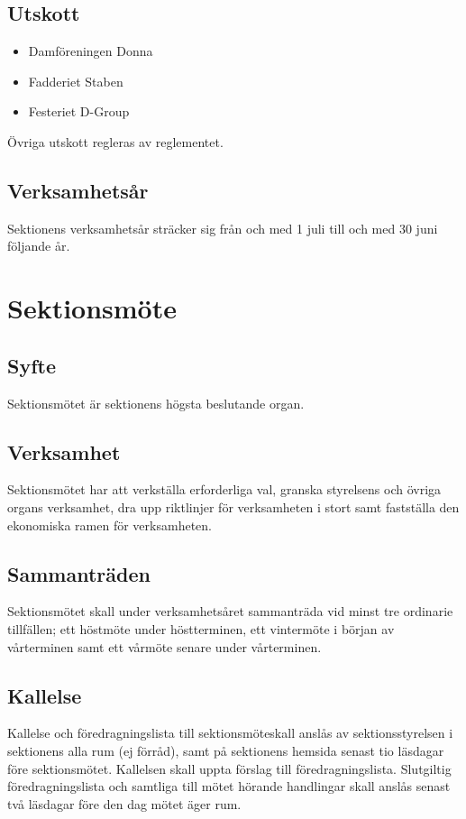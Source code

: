 \documentclass{datateknologsektionen-document}
\begin{document}
\subsection{Utskott}
\label{utskott}
\begin{itemize}
  \item Damföreningen Donna
  \item Fadderiet Staben
  \item Festeriet D-Group
\end{itemize}
Övriga utskott regleras av reglementet.

\subsection{Verksamhetsår}
Sektionens verksamhetsår sträcker sig från och med 1 juli till och med 30 juni följande
år.

\section{Sektionsmöte}
\subsection{Syfte}
Sektionsmötet är sektionens högsta beslutande organ.

\subsection{Verksamhet}
Sektionsmötet har att verkställa erforderliga val, granska styrelsens och övriga organs
verksamhet, dra upp riktlinjer för verksamheten i stort samt fastställa den ekonomiska
ramen för verksamheten.

\subsection{Sammanträden}
Sektionsmötet skall under verksamhetsåret sammanträda vid minst tre ordinarie tillfällen;
ett höstmöte under höstterminen, ett vintermöte i början av vårterminen samt ett vårmöte
senare under vårterminen.

\subsection{Kallelse}
Kallelse och föredragningslista till sektionsmöteskall anslås av sektionsstyrelsen i
sektionens alla rum (ej förråd), samt på sektionens hemsida senast tio läsdagar före
sektionsmötet. Kallelsen skall uppta förslag till föredragningslista. Slutgiltig
föredragningslista och samtliga till mötet hörande handlingar skall anslås senast två
läsdagar före den dag mötet äger rum.
\end{document}
